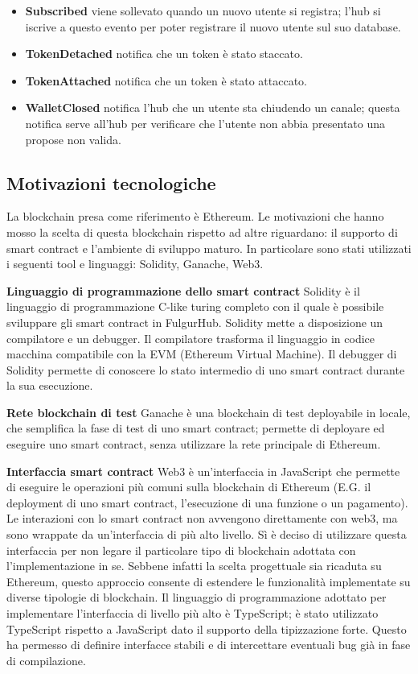 \documentclass[12pt,italian,]{book}
\providecommand{\tightlist}{%
  \setlength{\itemsep}{0pt}\setlength{\parskip}{0pt}}
\begin{document}
\begin{itemize}
\tightlist
\item
  \textbf{\textbf{Subscribed}} viene sollevato quando un nuovo utente si registra; l'hub si iscrive a questo evento per poter registrare il nuovo utente sul suo database.
\item
  \textbf{\textbf{TokenDetached}} notifica che un token è stato staccato.
\item
  \textbf{\textbf{TokenAttached}} notifica che un token è stato attaccato.
\item
  \textbf{\textbf{WalletClosed}} notifica l'hub che un utente sta chiudendo un canale; questa notifica serve all'hub per verificare che l'utente non abbia presentato una propose non valida.
\end{itemize}

\hypertarget{motivazioni-tecnologiche}{%
\subsection{Motivazioni tecnologiche}\label{motivazioni-tecnologiche}}

La blockchain presa come riferimento è Ethereum. Le motivazioni che hanno mosso la scelta di questa blockchain rispetto ad altre riguardano: il supporto di smart contract e l'ambiente di sviluppo maturo. In particolare sono stati utilizzati i seguenti tool e linguaggi: Solidity, Ganache, Web3.

\textbf{\textbf{Linguaggio di programmazione dello smart contract}} Solidity è il linguaggio di programmazione C-like turing completo con il quale è possibile sviluppare gli smart contract in FulgurHub. Solidity mette a disposizione un compilatore e un debugger. Il compilatore trasforma il linguaggio in codice macchina compatibile con la EVM (Ethereum Virtual Machine). Il debugger di Solidity permette di conoscere lo stato intermedio di uno smart contract durante la sua esecuzione.

\textbf{\textbf{Rete blockchain di test}} Ganache è una blockchain di test deployabile in locale, che semplifica la fase di test di uno smart contract; permette di deployare ed eseguire uno smart contract, senza utilizzare la rete principale di Ethereum.

\textbf{\textbf{Interfaccia smart contract}} Web3 è un'interfaccia in JavaScript che permette di eseguire le operazioni più comuni sulla blockchain di Ethereum (E.G. il deployment di uno smart contract, l'esecuzione di una funzione o un pagamento). Le interazioni con lo smart contract non avvengono direttamente con web3, ma sono wrappate da un'interfaccia di più alto livello. Sì è deciso di utilizzare questa interfaccia per non legare il particolare tipo di blockchain adottata con l'implementazione in se. Sebbene infatti la scelta progettuale sia ricaduta su Ethereum, questo approccio consente di estendere le funzionalità implementate su diverse tipologie di blockchain. Il linguaggio di programmazione adottato per implementare l'interfaccia di livello più alto è TypeScript; è stato utilizzato TypeScript rispetto a JavaScript dato il supporto della tipizzazione forte. Questo ha permesso di definire interfacce stabili e di intercettare eventuali bug già in fase di compilazione.
\end{document}
